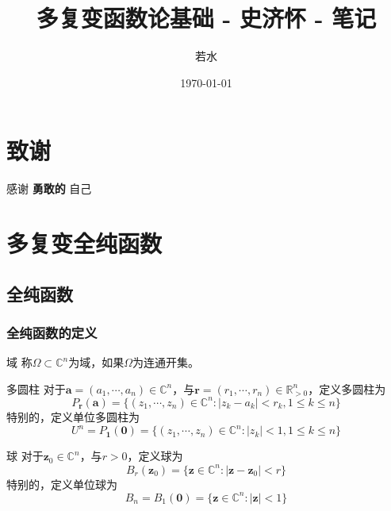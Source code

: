 \documentclass[lang = cn, scheme = chinese, thmcnt = section]{elegantbook}
\title{多复变函数论基础 - 史济怀 - 笔记}                %
\author{若水}                        %
\date{\today}                       %
\newcommand{\R}{\mathbb{R}}            %
\newcommand{\C}{\mathbb{C}}  		   %
\newcommand{\sub}{\subset}             %
\newcommand{\bs}{\boldsymbol}          %
\begin{document}
\maketitle       %

\frontmatter     %

\chapter*{致谢}


\vspace*{\fill}
	\begin{center}
		
		\large{感谢 \textbf{ 勇敢的 } 自己}
		
	\end{center}
\vspace*{\fill}

\tableofcontents %

\mainmatter      %

\chapter{多复变全纯函数}

\section{全纯函数}

\subsection{全纯函数的定义}

\begin{definition}{域}
	称$\Omega\sub\C^n$为域，如果$\Omega$为连通开集。
\end{definition}

\begin{definition}{多圆柱}
	对于$\bs{a}=(a_1,\cdots,a_n)\in\C^n$，与$\bs{r}=(r_1,\cdots,r_n)\in\R_{> 0}^n$，定义多圆柱为
	$$
	P_{\bs{r}}(\bs{a})=\{ (z_1,\cdots,z_n)\in\C^n:|z_k-a_k|<r_k,1\le k\le n \}
	$$
	特别的，定义单位多圆柱为
	$$
	U^n=P_{\bs{1}}(\bs{0})=\{ (z_1,\cdots,z_n)\in\C^n:|z_k|<1,1\le k\le n \}
	$$
\end{definition}

\begin{definition}{球}
	对于$\bs{z}_0\in\C^n$，与$r>0$，定义球为
	$$
	B_{r}(\bs{z}_0)=\{ \bs{z}\in\C^n:|\bs{z}-\bs{z}_0|<r \}
	$$
	特别的，定义单位球为
	$$
	B_n=B_1(\bs{0})=\{ \bs{z}\in\C^n:|\bs{z}|<1 \}
	$$
\end{definition}
\end{document}
